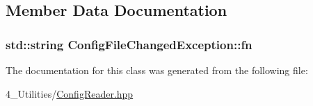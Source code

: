 \subsection{Member Data Documentation}
\subsubsection[{\texorpdfstring{fn}{fn}}]{\setlength{\rightskip}{0pt plus 5cm}std\+::string Config\+File\+Changed\+Exception\+::fn\hspace{0.3cm}{\ttfamily [protected]}}\hypertarget{class_config_file_changed_exception_af06ed19b894876c2a61f4e6c4dee675b}{}\label{class_config_file_changed_exception_af06ed19b894876c2a61f4e6c4dee675b}


The documentation for this class was generated from the following file\+:\begin{DoxyCompactItemize}
\item 
4\+\_\+\+Utilities/\hyperlink{_config_reader_8hpp}{Config\+Reader.\+hpp}\end{DoxyCompactItemize}
